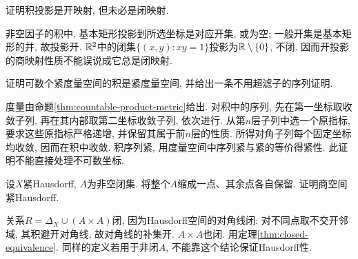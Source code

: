 \begin{exercise}
证明积投影是开映射, 但未必是闭映射.
\end{exercise}
\begin{solution}
非空因子的积中, 基本矩形投影到所选坐标是对应开集, 或为空; 一般开集是基本矩形的并, 故投影开. $\mathbb R^2$中的闭集$\{(x,y):xy=1\}$投影为$\mathbb R\setminus\{0\}$, 不闭. 因而开投影的商映射性质不能误说成它总是闭映射.
\end{solution}
\begin{exercise}
证明可数个紧度量空间的积是紧度量空间, 并给出一条不用超滤子的序列证明.
\end{exercise}
\begin{solution}
度量由命题\ref{thm:countable-product-metric}给出. 对积中的序列, 先在第一坐标取收敛子列, 再在其内部取第二坐标收敛子列, 依次进行. 从第$n$层子列中选一个原指标, 要求这些原指标严格递增, 并保留其属于前$n$层的性质. 所得对角子列每个固定坐标均收敛, 因而在积中收敛. 积序列紧, 用度量空间中序列紧与紧的等价得紧性. 此证明不能直接处理不可数坐标.
\end{solution}
\begin{exercise}
设$X$紧Hausdorff, $A$为非空闭集. 将整个$A$缩成一点、其余点各自保留. 证明商空间紧Hausdorff.
\end{exercise}
\begin{solution}
关系$R=\Delta_X\cup(A\times A)$闭, 因为Hausdorff空间的对角线闭: 对不同点取不交开邻域, 其积避开对角线, 故对角线的补集开. $A\times A$也闭. 用定理\ref{thm:closed-equivalence}. 同样的定义若用于非闭$A$, 不能靠这个结论保证Hausdorff性.
\end{solution}
